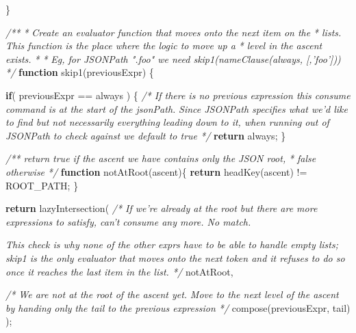 \documentclass[12pt, ]{article}
\newenvironment{Shaded}{}{}
\newcommand{\KeywordTok}[1]{\textcolor[rgb]{0.00,0.44,0.13}{\textbf{{#1}}}}
\newcommand{\CommentTok}[1]{\textcolor[rgb]{0.38,0.63,0.69}{\textit{{#1}}}}
\newcommand{\FunctionTok}[1]{\textcolor[rgb]{0.02,0.16,0.49}{{#1}}}
\newcommand{\NormalTok}[1]{{#1}}
\begin{document}
\begin{Shaded}
\begin{Highlighting}[]
   \NormalTok{\}            }
      
   \CommentTok{/**}
\CommentTok{    * Create an evaluator function that moves onto the next item on the }
\CommentTok{    * lists. This function is the place where the logic to move up a }
\CommentTok{    * level in the ascent exists. }
\CommentTok{    * }
\CommentTok{    * Eg, for JSONPath ".foo" we need skip1(nameClause(always, [,'foo']))}
\CommentTok{    */}
   \KeywordTok{function} \FunctionTok{skip1}\NormalTok{(previousExpr) \{}
   
   
      \KeywordTok{if}\NormalTok{( previousExpr == always ) \{}
         \CommentTok{/* If there is no previous expression this consume command }
\CommentTok{            is at the start of the jsonPath.}
\CommentTok{            Since JSONPath specifies what we'd like to find but not }
\CommentTok{            necessarily everything leading down to it, when running}
\CommentTok{            out of JSONPath to check against we default to true */}
         \KeywordTok{return} \NormalTok{always;}
      \NormalTok{\}}

      \CommentTok{/** return true if the ascent we have contains only the JSON root,}
\CommentTok{       *  false otherwise}
\CommentTok{       */}
      \KeywordTok{function} \FunctionTok{notAtRoot}\NormalTok{(ascent)\{}
         \KeywordTok{return} \FunctionTok{headKey}\NormalTok{(ascent) != ROOT_PATH;}
      \NormalTok{\}}
      
      \KeywordTok{return} \FunctionTok{lazyIntersection}\NormalTok{(}
               \CommentTok{/* If we're already at the root but there are more }
\CommentTok{                  expressions to satisfy, can't consume any more. No match.}

\CommentTok{                  This check is why none of the other exprs have to be able }
\CommentTok{                  to handle empty lists; skip1 is the only evaluator that }
\CommentTok{                  moves onto the next token and it refuses to do so once it }
\CommentTok{                  reaches the last item in the list. */}
               \NormalTok{notAtRoot,}
               
               \CommentTok{/* We are not at the root of the ascent yet.}
\CommentTok{                  Move to the next level of the ascent by handing only }
\CommentTok{                  the tail to the previous expression */} 
               \FunctionTok{compose}\NormalTok{(previousExpr, tail) }
      \NormalTok{);}
                                                                                                               

\end{Highlighting}
\end{Shaded}
\end{document}
